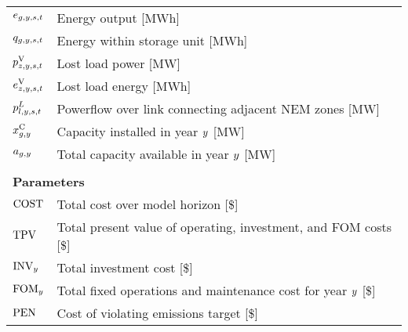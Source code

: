 \documentclass{article}
\begin{document}
\begin{longtable}{ p{}  p{}}
		$e_{g,y,s,t}$ & Energy output [MWh]\\
		$q_{g,y,s,t}$ & Energy within storage unit [MWh]\\
		$p^{\mathrm{V}}_{z,y,s,t}$ & Lost load power [MW]\\
		$e^{\mathrm{V}}_{z,y,s,t}$ & Lost load energy [MWh]\\
		$p^{L}_{l,y,s,t}$ & Powerflow over link connecting adjacent NEM zones [MW]\\
		$x^{\mathrm{C}}_{g,y}$ & Capacity installed in year $y$ [MW]\\
		$a_{g,y}$ & Total capacity available in year $y$ [MW]\\
		& \\
		\multicolumn{2}{l}{\textbf{Parameters}}\\
		$\mathrm{COST}$ & Total cost over model horizon [\$]\\
		$\mathrm{TPV}_{}$ & Total present value of operating, investment, and FOM costs [\$]\\
		$\mathrm{INV}_{y}$ & Total investment cost [\$]\\
		$\mathrm{FOM}_{y}$ & Total fixed operations and maintenance cost for year $y$ [\$]\\
		$\mathrm{PEN}$ & Cost of violating emissions target [\$]\\

\end{longtable}
\end{document}

